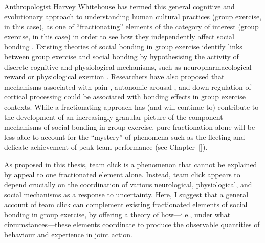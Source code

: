 Anthropologist Harvey Whitehouse has termed this general cognitive and evolutionary approach to understanding human cultural practices (group exercise, in this case), as one of ``fractionating'' elements of the category of interest (group exercise, in this case) in order to see how they independently affect social bonding \citep[][2]{Whitehouse2014}.  Existing theories of social bonding in group exercise identify links between group exercise and social bonding by hypothesising the activity of discrete cognitive and physiological mechanisms, such as neuropharmacological reward \citep[as a result of either behavioural synchrony; see][]{Dunbar2010,Tarr2014} or physiological exertion \citep{Cohen2009,Davis2015}.  Researchers have also proposed that mechanisms associated with pain \citep{Bastian2012,Xygalatas2013}, autonomic arousal \citep{Swann2010a}, and down-regulation of cortical processing \citep{Dietrich2004,Slingerland2014} could be associated with bonding effects in group exercise contexts.  While a fractionating approach has (and will continue to) contribute to the development of an increasingly granular picture of the component mechanisms of social bonding in group exercise, pure fractionation alone will be less able to account for the ``mystery'' of phenomena such as the fleeting and delicate achievement of peak team performance (see Chapter~\ref{}).

As proposed in this thesis, team click is a phenomenon that cannot be explained by appeal to one fractionated element alone.  Instead, team click appears to depend crucially on the coordination of various neurological, physiological, and social mechanisms as a response to uncertainty.  Here, I suggest that a general account of team click can complement existing fractionated elements of social bonding in group exercise, by offering a theory of how—i.e., under what circumstances---these elements coordinate to produce the observable quantities of behaviour and experience in joint action.

